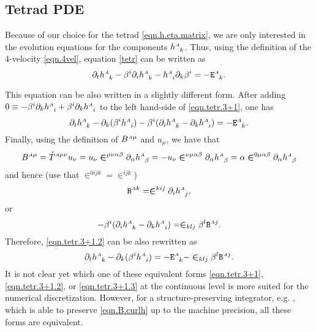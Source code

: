\documentclass[
10pt, %
a4paper, %
oneside, %
headinclude,footinclude, %
BCOR5mm, %
]{scrartcl}
\newcommand{\sA}{\mathsmaller A}
\newcommand{\pd}[1]{\partial_{#1}}
\newcommand{\tetrsymbol}{h}
\newcommand{\tetr}[2]{\tetrsymbol^{#1}_{\phantom{#1}#2}}
\newcommand{\aD}[2]{\mathcal{D}_{\phantom{#2}#1}^{#2}}	%
\newcommand{\Efin}[2]{\mathtt{E}^{#1}_{\phantom{#1}#2}}	%
\newcommand{\BT}[2]{B^{#1#2}}	%
\newcommand{\Bfin}[2]{\mathtt{B}^{#1#2}}	%
\newcommand{\aU}{\mathcal{U}}%
\newcommand{\LCsymb}{\bm{\in}}    %
\newcommand{\HDT}[1]{\accentset{\star}{T}^{#1}}
\begin{document}
\subsection{Tetrad PDE}

Because of our choice for the tetrad \eqref{eqn.h.eta.matrix}, we are only interested in the  
evolution equations for the components $ \tetr{\sA}{k} $. Thus, using the definition of 
the 4-velocity \eqref{eqn.4vel}, equation \eqref{tetr} can be written as
\begin{equation}\label{eqn.tetr.3+1}
	\pd{t} \tetr{\sA}{k} - \beta^i \pd{i} \tetr{\sA}{k} - \tetr{\sA}{i} \pd{k} \beta^i 
	= 
	-\Efin{\sA}{k}.
\end{equation}

This equation can be also written in a slightly different form. After adding $ 0\equiv - \beta^i 
\pd{k}\tetr{\sA}{i} + \beta^i \pd{k}\tetr{\sA}{i} $ to the left hand-side of \eqref{eqn.tetr.3+1}, 
one 
has  
\begin{equation}\label{eqn.tetr.3+1.2}
	\pd{t} \tetr{\sA}{k} - \pd{k} (\beta^i \tetr{\sA}{i}) - \beta^i (\pd{i}\tetr{\sA}{k} - 
	\pd{k}\tetr{\sA}{i})
	= 
	-\Efin{\sA}{k}.
\end{equation}
Finally, using the definition of $ \BT{\sA}{\mu} $ and $ u_\mu $, we have that 
\begin{equation}
	\BT{\sA}{\mu} = \HDT{\sA\mu\nu} u_\nu = u_\nu \LCsymb^{\mu\nu\alpha\beta} 
	\pd{\alpha}\tetr{\sA}{\beta} = -
	u_\nu \LCsymb^{\nu\mu\alpha\beta} \pd{\alpha}\tetr{\sA}{\beta} =
	\alpha \LCsymb^{0\mu\alpha\beta} \pd{\alpha}\tetr{\sA}{\beta} 
\end{equation}
and hence (use that $ \LCsymb^{0ijk} =\LCsymb^{ijk} $)
\begin{equation}\label{eqn.B.curlh}
	\Bfin{\sA}{k} = \LCsymb^{kij}\pd{i}\tetr{\sA}{j},
\end{equation}
or
\begin{equation}
	-\beta^i (\pd{i}\tetr{\sA}{k} - 
	\pd{k}\tetr{\sA}{i})
	=
	\LCsymb_{klj}\beta^l \Bfin{\sA}{j}.
\end{equation}
Therefore, \eqref{eqn.tetr.3+1.2} can be also rewritten as 
\begin{equation}\label{eqn.tetr.3+1.3}
	\pd{t} \tetr{\sA}{k} - \pd{k} (\beta^i \tetr{\sA}{i}) =  
	-\Efin{\sA}{k} - \LCsymb_{klj} \beta^l \Bfin{\sA}{j}.
\end{equation}
It is not clear yet which one of these equivalent forms \eqref{eqn.tetr.3+1}, \eqref{eqn.tetr.3+1.2}, 
or 
\eqref{eqn.tetr.3+1.3} at the continuous level is more suited for the numerical discretization. 
However, for a structure-preserving integrator, e.g. \cite{SIGPR2021}, which is able  to 
preserve \eqref{eqn.B.curlh} up to the machine precision, all these forms are equivalent.
\end{document}
